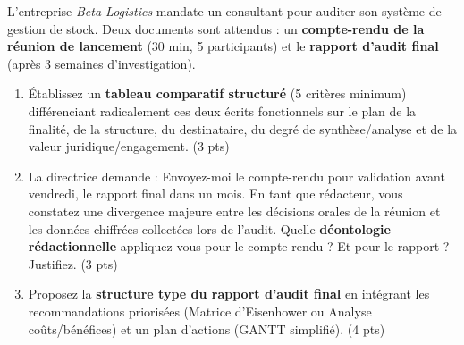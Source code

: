 \documentclass[11pt]{article}
\begin{document}
\begin{exercice}
L'entreprise \textit{Beta-Logistics} mandate un consultant pour auditer son système de gestion de stock. Deux documents sont attendus : un \textbf{compte-rendu de la réunion de lancement} (30 min, 5 participants) et le \textbf{rapport d'audit final} (après 3 semaines d'investigation).

\begin{enumerate}
    \item Établissez un \textbf{tableau comparatif structuré} (5 critères minimum) différenciant radicalement ces deux écrits fonctionnels sur le plan de la finalité, de la structure, du destinataire, du degré de synthèse/analyse et de la valeur juridique/engagement. (3 pts)
    \item La directrice demande : \og{}Envoyez-moi le compte-rendu pour validation avant vendredi, le rapport final dans un mois.\fg{} En tant que rédacteur, vous constatez une divergence majeure entre les décisions orales de la réunion et les données chiffrées collectées lors de l'audit. Quelle \textbf{déontologie rédactionnelle} appliquez-vous pour le compte-rendu ? Et pour le rapport ? Justifiez. (3 pts)
    \item Proposez la \textbf{structure type du rapport d'audit final} en intégrant les recommandations priorisées (Matrice d'Eisenhower ou Analyse coûts/bénéfices) et un plan d'actions (GANTT simplifié). (4 pts)
\end{enumerate}
\end{exercice}
\end{document}
